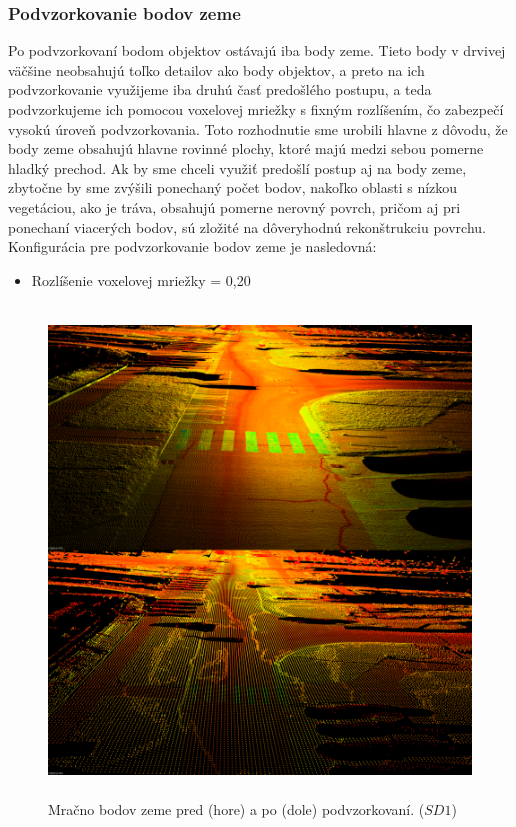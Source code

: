 \subsubsection{Podvzorkovanie bodov zeme}
\noindent Po podvzorkovaní bodom objektov ostávajú iba body zeme. Tieto body v drvivej väčšine neobsahujú toľko detailov ako body objektov, a preto na ich podvzorkovanie využijeme iba druhú časť predošlého postupu, a teda podvzorkujeme ich pomocou voxelovej mriežky s fixným rozlíšením, čo zabezpečí vysokú úroveň podvzorkovania.
\newline\indent Toto rozhodnutie sme urobili hlavne z dôvodu, že body zeme obsahujú hlavne rovinné plochy, ktoré majú medzi sebou pomerne hladký prechod. Ak by sme chceli využiť predošlí postup aj na body zeme, zbytočne by sme zvýšili ponechaný počet bodov, nakoľko oblasti s nízkou vegetáciou, ako je tráva, obsahujú pomerne nerovný povrch, pričom aj pri ponechaní viacerých bodov, sú zložité na dôveryhodnú rekonštrukciu povrchu. 
\newline\indent Konfigurácia pre podvzorkovanie bodov zeme je nasledovná:

\begin{itemize}
  \setlength\itemsep{0.2em}
  \item Rozlíšenie voxelovej mriežky = 0,20
\end{itemize}

\begin{figure}[!htbp]
  \centering
  \includegraphics[width=15cm, height=13cm]{img/downsample_ground.png}
  \caption{Mračno bodov zeme pred (hore) a po (dole) podvzorkovaní. ($SD1$)} 
  \label{fig:downsample_ground}
\end{figure} 

